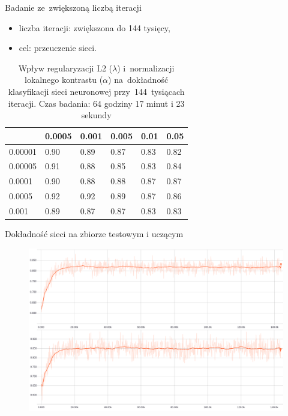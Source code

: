\documentclass[xcolor=dvipsnames]{beamer}
\begin{document}
\begin{frame}{Badanie ze~zwiększoną liczbą iteracji}
    \begin{itemize}
        \item liczba iteracji: zwiększona do 144 tysięcy,
        \item cel: przeuczenie sieci.
    \end{itemize}
    \begin{table}[H]
        \centering
        \begin{tabular}{|l|l|l|l|l|l|}
            \hline
            \backslashbox{$\alpha$}{$\lambda$} & 0.0005 & 0.001 & 0.005 & 0.01 & 0.05 \\
            \hline
            0.00001 & 0.90 & 0.89 & 0.87 & 0.83 & 0.82 \\
            \hline
            0.00005 & 0.91 & 0.88 & 0.85 & 0.83 & 0.84 \\
            \hline
            0.0001  & 0.90 & 0.88 & 0.88 & 0.87 & 0.87 \\
            \hline
            0.0005  & 0.92 & 0.92 & 0.89 & 0.87 & 0.86 \\
            \hline
            0.001   & 0.89 & 0.87 & 0.87 & 0.83 & 0.83 \\
            \hline
        \end{tabular}
        \caption{Wpływ regularyzacji L2 ($\lambda$) i~normalizacji lokalnego kontrastu ($\alpha$) na~dokładność klasyfikacji
        sieci neuronowej przy~144~tysiącach iteracji. Czas badania: 64 godziny 17 minut i 23 sekundy}
        \label{table:wyniki2}
    \end{table}
\end{frame}
\begin{frame}{Dokładność sieci na zbiorze testowym i uczącym}
  \begin{figure}
    \includegraphics[width=\textwidth]{img/badanie_2.png}
  \end{figure}
\end{frame}
\end{document}
